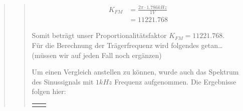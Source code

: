 \begin{quote}
\begin{quote}
\begin{equation*}
\begin{split}
	    K_{FM} &= \frac{2 \pi \cdot 1.786 kHz}{1 V}\\
	    	   &= 11221.768    		
       \end{split}
     \end{equation*}
        
        Somit beträgt unser Proportionalitätsfaktor $K_{FM} = 11221.768$.\\
        
        Für die Berechnung der Trägerfrequenz wird folgendes getan\ldots 
        (müssen wir auf jeden Fall noch ergänzen) 
        
        Um einen Vergleich anstellen zu können, wurde auch das Spektrum des
        Sinussignals mit $1 kHz$ Frequenz aufgenommen. Die Ergebnisse folgen
        hier:
        
                \begin{center}
            \begin{tabular}{ll}

            \hspace{-14em}
                \begin{minipage}{0.6\textwidth}


\end{minipage}
\end{tabular}
\end{center}
\end{quote}
\end{quote}
